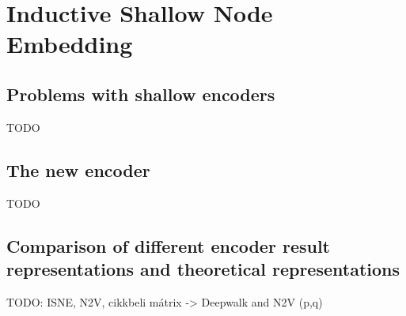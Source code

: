 \chapter{Inductive Shallow Node Embedding}
\label{sec:ISNE}

\section{Problems with shallow encoders}
TODO

\section{The new encoder}
TODO

\section{Comparison of different encoder result representations and theoretical representations}
TODO: ISNE, N2V, cikkbeli mátrix -> Deepwalk and N2V (p,q)
